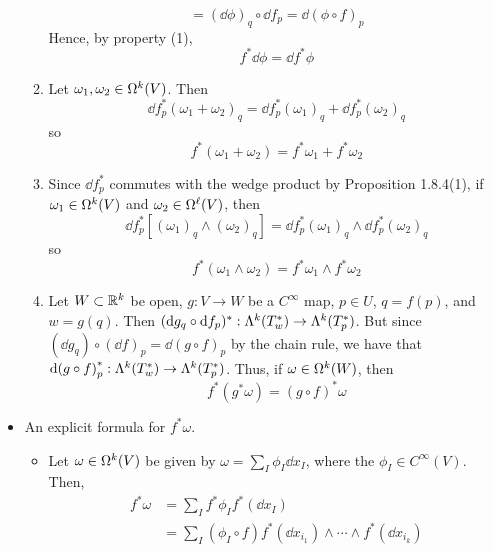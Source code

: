 \documentclass[../notes.tex]{subfiles}
\begin{document}
\begin{itemize}
\begin{enumerate}
\begin{equation*}
            = (\dd\phi)_q\circ\dd f_p
            = \dd(\phi\circ f)_p
        \end{equation*}
        Hence, by property (1),
        \begin{equation*}
            f^*\dd\phi = \dd f^*\phi
        \end{equation*}
        \item Let $\omega_1,\omega_2\in\ome[k]{V}$. Then
        \begin{equation*}
            \dd f_p^*(\omega_1+\omega_2)_q = \dd f_p^*(\omega_1)_q+\dd f_p^*(\omega_2)_q
        \end{equation*}
        so
        \begin{equation*}
            f^*(\omega_1+\omega_2) = f^*\omega_1+f^*\omega_2
        \end{equation*}
        \item Since $\dd f_p^*$ commutes with the wedge product by Proposition 1.8.4(1), if $\omega_1\in\ome[k]{V}$ and $\omega_2\in\ome[\ell]{V}$, then
        \begin{equation*}
            \dd f_p^*[(\omega_1)_q\wedge(\omega_2)_q] = \dd f_p^*(\omega_1)_q\wedge\dd f_p^*(\omega_2)_q
        \end{equation*}
        so
        \begin{equation*}
            f^*(\omega_1\wedge\omega_2) = f^*\omega_1\wedge f^*\omega_2
        \end{equation*}
        \item Let $W\subset\R^k$ be open, $g:V\to W$ be a $C^\infty$ map, $p\in U$, $q=f(p)$, and $w=g(q)$. Then $(\dd g_q\circ\dd f_p)^*:\lam[k]{T_w^*}\to\lam[k]{T_p^*}$. But since $(\dd g_q)\circ(\dd f)_p = \dd(g\circ f)_p$ by the chain rule, we have that $\dd(g\circ f)_p^*:\lam[k]{T_w^*}\to\lam[k]{T_p^*}$. Thus, if $\omega\in\ome[k]{W}$, then
        \begin{equation*}
            f^*(g^*\omega) = (g\circ f)^*\omega
        \end{equation*}
    \end{enumerate}
    \item An explicit formula for $f^*\omega$.
    \begin{itemize}
        \item Let $\omega\in\ome[k]{V}$ be given by $\omega=\sum_I\phi_I\dd{x_I}$, where the $\phi_I\in C^\infty(V)$. Then,
        \begin{align*}
            f^*\omega &= \sum_If^*\phi_If^*(\dd{x_I})\tag{1}\\
            &= \sum_I(\phi_I\circ f)f^*(\dd x_{i_1})\wedge\cdots\wedge f^*(\dd x_{i_k})\tag{4}\\

\end{align*}
\end{itemize}
\end{itemize}
\end{document}
